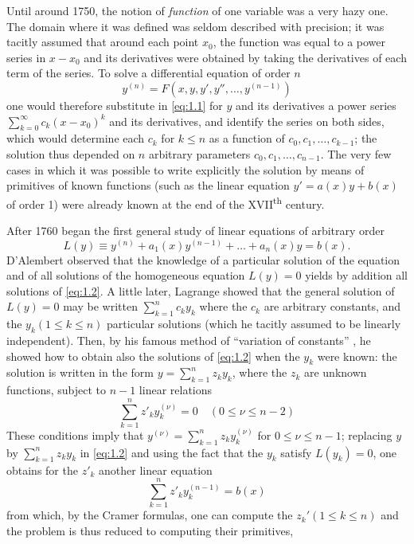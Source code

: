 \documentclass[12pt,a4paper,leqno,twoside]{extbook}
\newcommand{\supth}{\texorpdfstring{\textsuperscript{th}}{th}}
\begin{document}
Until around 1750, the notion of \emph{function} of one variable was a very hazy one. The domain where it was defined was seldom described with precision; it was tacitly assumed that around each point \(x_0\), the function was equal to a power series in \(x - x_0\) and its derivatives were obtained by taking the derivatives of each term of the series. To solve a differential equation of order \(n\)
\begin{equation}
    \label{eq:1.1}
    y^{(n)} = F(x, y, y', y'', \ldots, y^{(n-1)})
\end{equation}
one would therefore substitute in \eqref{eq:1.1} for \(y\) and its derivatives a power series \(\sum\limits_{k=0}^\infty c_k (x - x_0)^k\) and its derivatives, and identify the series on both sides, which would determine each  \(c_k\) for \(k \leq n\) as a function of \(c_0, c_1, \ldots, c_{k-1}\); the solution thus depended on \(n\) arbitrary parameters \(c_0, c_1, \ldots, c_{n-1}\). The very few cases in which it was possible to write explicitly the solution by means of primitives of known functions (such as the linear equation \(y' = a(x)y + b(x)\) of order 1) were already known at the end of the XVII\supth{} century.

After 1760 began the first general study of linear equations of arbitrary order
\begin{equation}
    \label{eq:1.2}
    L(y) \equiv y^{(n)} + a_1(x) y^{(n-1)} + \ldots + a_n(x) y = b(x).
\end{equation}
D'Alembert observed that the knowledge of a particular solution of the equation and of all solutions of the homogeneous equation \(L(y) = 0\) yields by addition all solutions of \eqref{eq:1.2}. A little later, Lagrange \cite[vol.~I, p.~474]{135} showed that the general solution of \(L(y) = 0\) may be written \(\sum\limits_{k=1}^n c_k y_k\) where the \(c_k\) are arbitrary constants, and the \(y_k (1 \leq k \leq n)\) particular solutions (which he tacitly assumed to be linearly independent). Then, by his famous method of  ``variation of constants'' \cite[vol.~IV, p.~159]{135}, he showed how to obtain also the solutions of \eqref{eq:1.2} when the \(y_k\) were known: the solution is written in the form \(y = \sum\limits_{k=1}^n z_k y_k\), where the \(z_k\) are unknown functions, subject to \(n-1\) linear relations
\begin{equation}
    \label{eq:1.3}
    \sum_{k=1}^n z'_k y_k^{(\nu)} = 0 \quad (0 \leq \nu \leq n-2)
\end{equation}
These conditions imply that \(y^{(\nu)} = \sum\limits_{k=1}^n z_k y_k^{(\nu)}\) for \(0 \leq \nu \leq n-1\); replacing \(y\) by \(\sum\limits_{k=1}^n z_k y_k\) in \eqref{eq:1.2} and using the fact that the \(y_k\) satisfy \(L(y_k) = 0\), one obtains for the \(z'_k\) another linear equation
\begin{equation}
    \label{eq:1.4}
    \sum_{k=1}^n z'_k y_k^{(n-1)}  = b(x)
\end{equation}
from which, by the Cramer formulas, one can compute the \(z_k' (1 \leq k \leq n)\) and the problem is thus reduced to computing their primitives,
\end{document}
